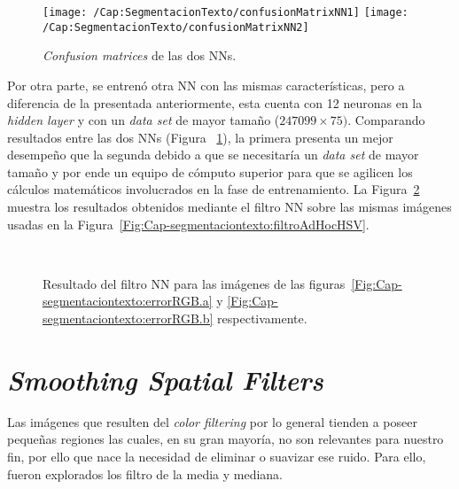 \begin{figure}[h!]
	\centering
  \texttt{[image: /Cap:SegmentacionTexto/confusionMatrixNN1]} { }
	\texttt{[image: /Cap:SegmentacionTexto/confusionMatrixNN2]}
	\caption{\textit{Confusion matrices} de las dos NNs.}
	\label{Fig:Cap-segmentaciontexto:confusionMatrixNNs}
\end{figure}

Por otra parte, se entrenó otra NN con las mismas características, pero a 
diferencia de la presentada anteriormente, esta cuenta con 12 neuronas en la
\textit{hidden layer} y con un \textit{data set} de mayor tamaño ($247099 \times
75)$. Comparando resultados entre las dos NNs (Figura
~\ref{Fig:Cap-segmentaciontexto:confusionMatrixNNs}), la primera presenta un
mejor desempeño que la segunda debido a que se necesitaría un \textit{data set}
de mayor tamaño y por ende un equipo de cómputo superior para que se agilicen
los cálculos matemáticos involucrados en la fase de entrenamiento. La
Figura~\ref{Fig:Cap-segmentaciontexto:resultadoNN} muestra los resultados
obtenidos mediante el filtro NN sobre las mismas imágenes usadas en la
Figura~\ref{Fig:Cap-segmentaciontexto:filtroAdHocHSV}.

\begin{figure}[h!]
	\centering
   { }
   \\
	\caption{Resultado del filtro NN para las imágenes de las figuras~\ref{Fig:Cap-segmentaciontexto:errorRGB.a} y \ref{Fig:Cap-segmentaciontexto:errorRGB.b} respectivamente.}
	\label{Fig:Cap-segmentaciontexto:resultadoNN}
\end{figure}

\clearpage
\section{\textit{Smoothing Spatial Filters}}
Las imágenes que resulten del \textit{color filtering} por lo general tienden 
a poseer pequeñas regiones las cuales, en su gran mayoría, no son relevantes
para nuestro fin, por ello que nace la necesidad de eliminar o suavizar ese
ruido. Para ello, fueron explorados los filtro de la media y mediana.

